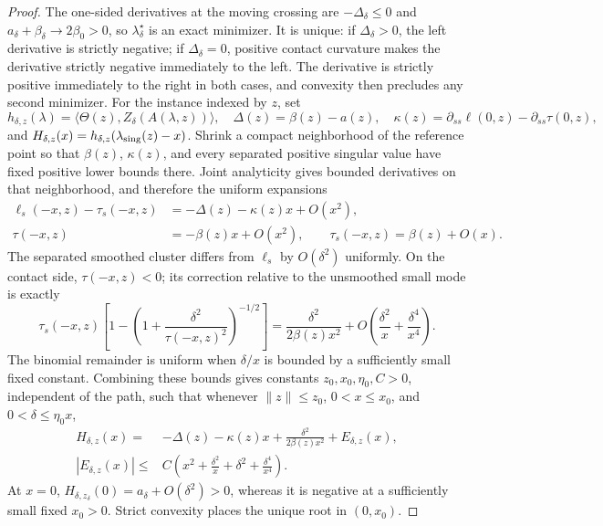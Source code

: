 \begin{proof}
The one-sided derivatives at the moving crossing are
\(-\Delta_\delta\le0\) and
\(a_\delta+\beta_\delta\to2\beta_0>0\), so
\(\lambda_\delta^\star\) is an exact minimizer.  It is unique: if
\(\Delta_\delta>0\), the left derivative is strictly negative; if
\(\Delta_\delta=0\), positive contact curvature makes the derivative
strictly negative immediately to the left.  The derivative is strictly
positive immediately to the right in both cases, and convexity then
precludes any second minimizer.  For the instance indexed by
\(z\), set
\[
 h_{\delta,z}(\lambda)
 =\langle\Theta(z),Z_\delta(A(\lambda,z))\rangle,
 \quad
 \Delta(z)=\beta(z)-a(z),
 \quad
 \kappa(z)=\partial_{ss}\ell(0,z)-\partial_{ss}\tau(0,z),
\]
and \(H_{\delta,z}(x)=h_{\delta,z}(\lambda_{\rm sing}(z)-x)\).
Shrink a compact neighborhood of the reference point so that
\(\beta(z)\), \(\kappa(z)\), and every separated positive singular value
have fixed positive lower bounds there.  Joint analyticity gives bounded
derivatives on that neighborhood, and therefore the uniform expansions
\begin{align*}
 \ell_s(-x,z)-\tau_s(-x,z)&=-\Delta(z)-\kappa(z)x+O(x^2),\\
 \tau(-x,z)&=-\beta(z)x+O(x^2),\qquad
 \tau_s(-x,z)=\beta(z)+O(x).
\end{align*}
The separated smoothed cluster differs from \(\ell_s\) by \(O(\delta^2)\)
uniformly.  On the contact side, \(\tau(-x,z)<0\); its correction relative
to the unsmoothed small mode is exactly
\[
 \tau_s(-x,z)\left[1-
 \left(1+\frac{\delta^2}{\tau(-x,z)^2}\right)^{-1/2}\right]
 =\frac{\delta^2}{2\beta(z)x^2}
  +O\!\left(\frac{\delta^2}{x}+\frac{\delta^4}{x^4}\right).
\]
The binomial remainder is uniform when \(\delta/x\) is bounded by a
sufficiently small fixed constant.  Combining these bounds gives constants
\(z_0,x_0,\eta_0,C>0\), independent of the path, such that
whenever \(\|z\|\le z_0\), \(0<x\le x_0\), and
\(0<\delta\le\eta_0x\),
\begin{align}
 H_{\delta,z}(x)
 ={}&-\Delta(z)-\kappa(z)x
 +\frac{\delta^2}{2\beta(z)x^2}+E_{\delta,z}(x),
 \label{eq:crossover-functional-main}\\[-0.2em]
 |E_{\delta,z}(x)|
 \le{}&C\left(x^2+\frac{\delta^2}{x}
                    +\delta^2+\frac{\delta^4}{x^4}\right).
 \label{eq:crossover-remainder-main}
\end{align}
At \(x=0\), \(H_{\delta,z_\delta}(0)=a_\delta+O(\delta^2)>0\), whereas
it is negative at a sufficiently small fixed \(x_0>0\).  Strict convexity
places the unique root in \((0,x_0)\).


\end{proof}

